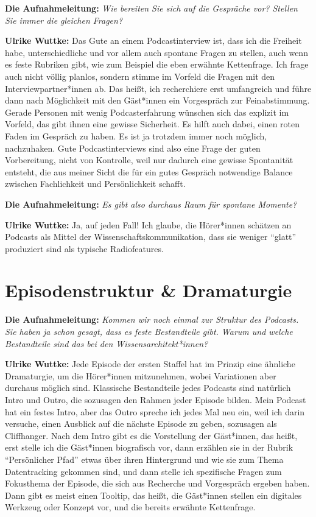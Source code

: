 \documentclass[a4paper,
fontsize=11pt,
oneside,
numbers=noperiodatend,
parskip=half-,
bibliography=totoc,
final
]{scrartcl}
\begin{document}
\textbf{Die Aufnahmeleitung:} \emph{Wie bereiten Sie sich auf die
Gespräche vor? Stellen Sie immer die gleichen Fragen?}

\textbf{Ulrike Wuttke:} Das Gute an einem Podcastinterview ist, dass ich
die Freiheit habe, unterschiedliche und vor allem auch spontane Fragen
zu stellen, auch wenn es feste Rubriken gibt, wie zum Beispiel die eben
erwähnte Kettenfrage. Ich frage auch nicht völlig planlos, sondern
stimme im Vorfeld die Fragen mit den Interviewpartner*innen ab. Das
heißt, ich recherchiere erst umfangreich und führe dann nach Möglichkeit
mit den Gäst*innen ein Vorgespräch zur Feinabstimmung. Gerade Personen
mit wenig Podcasterfahrung wünschen sich das explizit im Vorfeld, das
gibt ihnen eine gewisse Sicherheit. Es hilft auch dabei, einen roten
Faden im Gespräch zu haben. Es ist ja trotzdem immer noch möglich,
nachzuhaken. Gute Podcastinterviews sind also eine Frage der guten
Vorbereitung, nicht von Kontrolle, weil nur dadurch eine gewisse
Spontanität entsteht, die aus meiner Sicht die für ein gutes Gespräch
notwendige Balance zwischen Fachlichkeit und Persönlichkeit schafft.

\textbf{Die Aufnahmeleitung:} \emph{Es gibt also durchaus Raum für
spontane Momente?}

\textbf{Ulrike Wuttke:} Ja, auf jeden Fall! Ich glaube, die Hörer*innen
schätzen an Podcasts als Mittel der Wissenschaftskommunikation, dass sie
weniger \enquote{glatt} produziert sind als typische Radiofeatures.

\section{Episodenstruktur \&
Dramaturgie}\label{episodenstruktur-dramaturgie}

\textbf{Die Aufnahmeleitung:} \emph{Kommen wir noch einmal zur Struktur
des Podcasts. Sie haben ja schon gesagt, dass es feste Bestandteile
gibt. Warum und welche Bestandteile sind das bei den
Wissensarchitekt*innen?}

\textbf{Ulrike Wuttke:} Jede Episode der ersten Staffel hat im Prinzip
eine ähnliche Dramaturgie, um die Hörer*innen mitzunehmen, wobei
Variationen aber durchaus möglich sind. Klassische Bestandteile jedes
Podcasts sind natürlich Intro und Outro, die sozusagen den Rahmen jeder
Episode bilden. Mein Podcast hat ein festes Intro, aber das Outro
spreche ich jedes Mal neu ein, weil ich darin versuche, einen Ausblick
auf die nächste Episode zu geben, sozusagen als Cliffhanger. Nach dem
Intro gibt es die Vorstellung der Gäst*innen, das heißt, erst stelle ich
die Gäst*innen biografisch vor, dann erzählen sie in der Rubrik
\enquote{Persönlicher Pfad} etwas über ihren Hintergrund und wie sie zum
Thema Datentracking gekommen sind, und dann stelle ich spezifische
Fragen zum Fokusthema der Episode, die sich aus Recherche und
Vorgespräch ergeben haben. Dann gibt es meist einen Tooltip, das heißt,
die Gäst*innen stellen ein digitales Werkzeug oder Konzept vor, und die
bereits erwähnte Kettenfrage.
\end{document}
